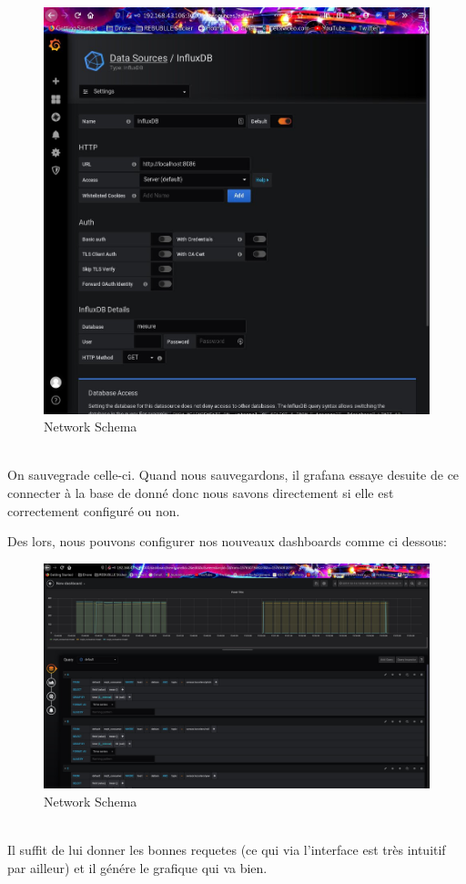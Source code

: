 \documentclass[10pt,a4paper]{article}
\begin{document}
  \begin{figure}[h!]
\centering
\includegraphics[scale=0.50]{screen/2.jpg}
\caption{Network Schema}
\label{fig:net }
\end{figure}
\\On sauvegrade celle-ci. Quand nous sauvegardons, il grafana essaye desuite de ce connecter à la base de donné donc nous savons directement si elle est correctement configuré ou non. \newpage 

Des lors, nous pouvons configurer nos nouveaux dashboards comme ci dessous:
  \begin{figure}[h!]
\centering
\includegraphics[scale=0.50]{screen/3.jpg}
\caption{Network Schema}
\label{fig:net }
\end{figure}
\\ Il suffit de lui donner les bonnes requetes (ce qui via l'interface est très intuitif par ailleur) et il génére le grafique qui va bien. 
\end{document}
